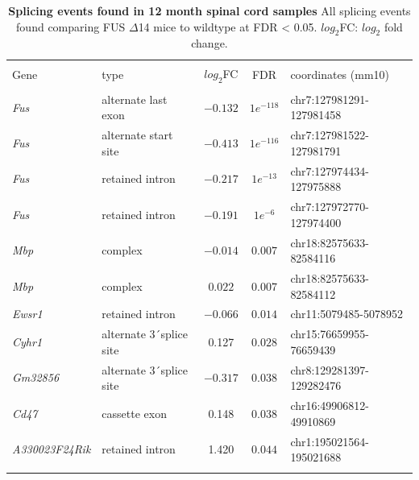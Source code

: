 \begin{table}[!htbp] 
	\centering 
	\caption[Splicing events found in 12 month spinal cord samples]{
		\textbf{Splicing events found in 12 month spinal cord samples}
	All splicing events found comparing FUS $\Delta$14 mice to wildtype at FDR < 0.05. 
	$log_2$FC: $log_2$ fold change.
	}
	\label{tab:fus_mouse_splicing} 
	\begin{tabular}{@{\extracolsep{5pt}} llccl} 
		\\[-1.8ex]\hline 
		\hline \\[-1.8ex] 
		Gene & type & $log_2$FC & FDR & coordinates (mm10)\\ 
		\hline \\[-1.8ex] 
		\textit{Fus} & alternate last exon & $-0.132$ & $1e^{-118}$ & chr7:127981291-127981458 \\ 
		\textit{Fus} & alternate start site & $-0.413$ & $1e^{-116}$ & chr7:127981522-127981791 \\ 
		\textit{Fus} & retained intron & $-0.217$ & $1e^{-13}$ & chr7:127974434-127975888 \\ 
		\textit{Fus} & retained intron & $-0.191$ & $1e^{-6}$ & chr7:127972770-127974400 \\ 
		\textit{Mbp} & complex  & $-0.014$ & $0.007$ & chr18:82575633-82584116 \\ 
		\textit{Mbp} & complex & $0.022$ & $0.007$ & chr18:82575633-82584112 \\ 
		 \textit{Ewsr1} & retained intron & $-0.066$ & $0.014$ & chr11:5079485-5078952 \\ 
		\textit{Cyhr1} & alternate 3\'\ splice site & 0.127 & $0.028$ & chr15:76659955-76659439 \\ 
		\textit{Gm32856} & alternate 3\'\ splice site & $-0.317$ & $0.038$ & chr8:129281397-129282476 \\ 
		\textit{Cd47} & cassette exon & 0.148 & $0.038$ & chr16:49906812-49910869 \\ 
		\textit{A330023F24Rik} & retained intron & 1.420 & $0.044$ & chr1:195021564-195021688 \\ 
		\hline \\[-1.8ex] 
	\end{tabular} 
\end{table} 



